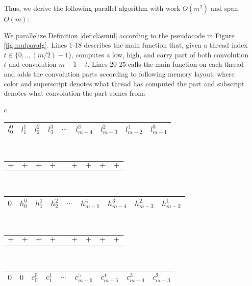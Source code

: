 Thus, we derive the following parallel algorithm with work $O(m^2)$ and span
$O(m)$:

\begin{definition}\label{def:convmul}
  We parallelize Definition \ref{def:clasmul} according to the pseudocode in
  Figure \ref{fig:mulparalg}. Lines 1-18 describes the main function that, given
  a thread index ${t\in \{0,..,(m/2)-1\}}$, computes a low, high, and carry part
  of both convolution $t$ and convolution $m-1-t$. Lines 20-25 calls the main
  function on each thread and adds the convolution parts according to following
  memory layout, where color and superscript denotes what thread has computed
  the part and subscript denotes what convolution the part comes from:
\begin{center}
  \small
  \begin{tabular}{c}
    \begin{tabular}{|C{0.8cm}|C{0.8cm}|C{0.8cm}|C{0.8cm}|C{0.5cm}|C{0.8cm}|C{0.8cm}|C{0.8cm}|C{0.8cm}|}
      \hline
      \red $l^0_0$ & \blue $l^1_1$ & \green $l^2_2$ & \brown $l^3_3$ & $\ldots$ & \brown $l^3_{m-4}$ & \green $l^2_{m-3}$ & \blue $l^1_{m-2}$ & \red $l^0_{m-1}$\\
      \hline
    \end{tabular}\\[-0.3ex]
    \begin{tabular}{C{0.81cm}C{0.81cm}C{0.81cm}C{0.81cm}C{0.51cm}C{0.81cm}C{0.81cm}C{0.81cm}C{0.81cm}}
      $+$ & $+$ & $+$ & $+$ &  & $+$ & $+$ & $+$ & $+$
    \end{tabular}\\[-0.3ex]
    \begin{tabular}{|C{0.8cm}|C{0.8cm}|C{0.8cm}|C{0.8cm}|C{0.5cm}|C{0.8cm}|C{0.8cm}|C{0.8cm}|C{0.8cm}|}
      \hline
      $0$ & \red $h^0_0$ & \blue $h^1_1$ & \green $h^2_2$ & $\ldots$ & \color{magenta} $h^{4}_{m-5}$ & \brown $h^{3}_{m-4}$ & \green $h^{2}_{m-3}$ & \blue $h^1_{m-2}$\\
      \hline
    \end{tabular}\\[-0.3ex]
    \begin{tabular}{C{0.81cm}C{0.81cm}C{0.81cm}C{0.81cm}C{0.51cm}C{0.81cm}C{0.81cm}C{0.81cm}C{0.81cm}}
      $+$ & $+$ & $+$ & $+$ &  & $+$ & $+$ & $+$ & $+$
    \end{tabular}\\[-0.3ex]
    \begin{tabular}{|C{0.8cm}|C{0.8cm}|C{0.8cm}|C{0.8cm}|C{0.5cm}|C{0.8cm}|C{0.8cm}|C{0.8cm}|C{0.8cm}|}
      \hline
      $0$ & $0$ & \red $c^{0}_0$ & \blue $c^{1}_1$ & $\ldots$ & \color{cyan} $c^{5}_{m-6}$ & \color{magenta} $c^{4}_{m-5}$ & \brown $c^{3}_{m-4}$ & \green $c^{2}_{m-3}$\\
      \hline
    \end{tabular}
  \end{tabular}
\end{center}
\end{definition}~

